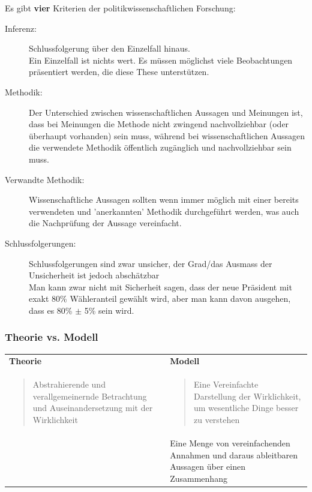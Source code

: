 \documentclass[a4paper, 11pt]{article}
\begin{document}
\vspace{10px }

\noindent Es gibt \textbf{vier} Kriterien der politikwissenschaftlichen Forschung: 

\begin{description}
	\item[Inferenz: ] Schlussfolgerung über den Einzelfall hinaus. \\
	Ein Einzelfall ist nichts wert. Es müssen möglichst viele Beobachtungen präsentiert werden, die diese These unterstützen.
	\item[Methodik: ] Der Unterschied zwischen wissenschaftlichen Aussagen und Meinungen ist, dass bei Meinungen die Methode nicht zwingend nachvollziehbar (oder überhaupt vorhanden) sein muss, während bei wissenschaftlichen Aussagen die verwendete Methodik öffentlich zugänglich und nachvollziehbar sein muss.
	\item[Verwandte Methodik: ] Wissenschaftliche Aussagen sollten wenn immer möglich mit einer bereits verwendeten und 'anerkannten' Methodik durchgeführt werden, was auch die Nachprüfung der Aussage vereinfacht.
	\item[Schlussfolgerungen: ] Schlussfolgerungen sind zwar unsicher, der Grad/das Ausmass der Unsicherheit ist jedoch abschätzbar \\
	Man kann zwar nicht mit Sicherheit sagen, dass der neue Präsident mit exakt 80\% Wähleranteil gewählt wird, aber man kann davon ausgehen, dass es 80\% $\pm$ 5\% sein wird.
\end{description}

\subsubsection{Theorie vs. Modell}

\begin{tabularx}{\textwidth}{p{7cm}p{7cm}} 
	\textbf{Theorie} &  \textbf{Modell}\\ 
		\blockquote{Abstrahierende und verallgemeinernde Betrachtung und Auseinandersetzung mit der Wirklichkeit} & \blockquote{Eine Vereinfachte Darstellung der Wirklichkeit, um wesentliche Dinge besser zu verstehen} \\
		  & Eine Menge von vereinfachenden Annahmen und daraus ableitbaren Aussagen über einen Zusammenhang \\ 
\end{tabularx}

\vspace{10px}
\end{document}
